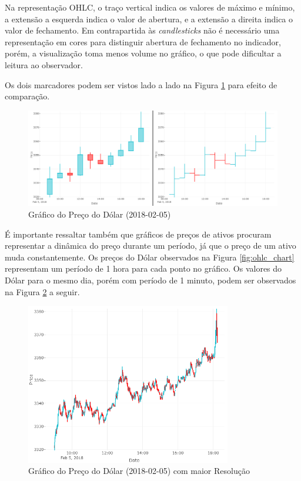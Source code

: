 \documentclass[12pt]{article}
\begin{document}
Na representação OHLC, o traço vertical indica os valores de máximo e mínimo, a extensão
a esquerda indica o valor de abertura, e a extensão a direita indica o valor de fechamento.
Em contrapartida às \textit{candlesticks} não é necessário uma representação em cores para
distinguir abertura de fechamento no indicador, porém, a visualização toma menos volume no
gráfico, o que pode dificultar a leitura ao observador.

Os dois marcadores podem ser vistos lado a lado na Figura \ref{fig:chart_comp} para efeito
de comparação.

\begin{figure}[H]
	\centering
	\includegraphics[width=\textwidth]{chart_comp.png}
	\caption{Gráfico do Preço do Dólar (2018-02-05)}
	\label{fig:chart_comp}
\end{figure}

É importante ressaltar também que gráficos de preços de ativos procuram representar a dinâmica 
do preço durante um período, já que o preço de um ativo muda constantemente. Os preços do Dólar
observados na Figura \ref{fig:ohlc_chart} representam um período de 1 hora para cada ponto
no gráfico. Os valores do Dólar para o mesmo dia, porém com período de 1 minuto, podem ser
observados na Figura \ref{fig:ohlc_chart_detailed} a seguir.

\begin{figure}[H]
	\centering
	\includegraphics[width=0.8\textwidth]{ohlc_chart_detailed.png}
	\caption{Gráfico do Preço do Dólar (2018-02-05) com maior Resolução}
	\label{fig:ohlc_chart_detailed}
\end{figure}
\end{document}
